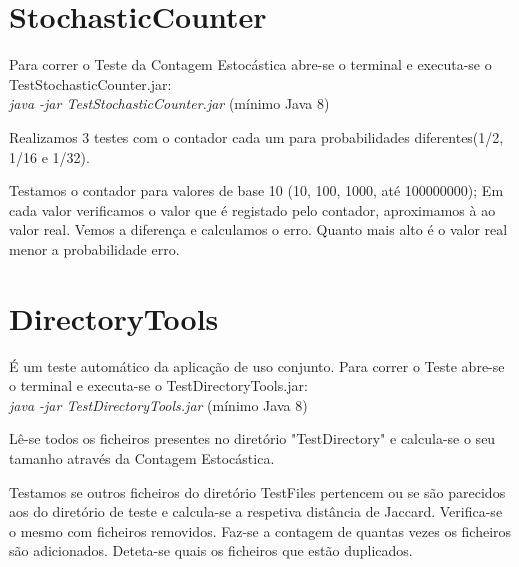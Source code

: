 \documentclass{report}
\begin{document}
\section{StochasticCounter}
Para correr o Teste da Contagem Estocástica abre-se o terminal e executa-se o TestStochasticCounter.jar:
\\
\textit{ java -jar TestStochasticCounter.jar} (mínimo Java 8)

Realizamos 3 testes com o contador cada um para probabilidades diferentes(1/2, 1/16 e 1/32).

Testamos o contador para valores de base 10 (10, 100, 1000, até 100000000);
Em cada valor verificamos o valor que é registado pelo contador, aproximamos à ao valor real.
Vemos a diferença e calculamos o erro. Quanto mais alto é o valor real menor a probabilidade erro.

\section{DirectoryTools}
\par É um teste automático da aplicação de uso conjunto.
Para correr o Teste  abre-se o terminal e executa-se o TestDirectoryTools.jar:
\\
\textit{ java -jar TestDirectoryTools.jar} (mínimo Java 8)


Lê-se todos os ficheiros presentes no diretório "TestDirectory" e calcula-se o seu tamanho através da Contagem Estocástica.

Testamos se outros ficheiros do diretório TestFiles pertencem ou se são parecidos aos do diretório de teste e calcula-se a respetiva distância de Jaccard. Verifica-se o mesmo com ficheiros removidos.
Faz-se a contagem de quantas vezes os ficheiros são adicionados.
Deteta-se quais os ficheiros que estão duplicados.
\end{document}
